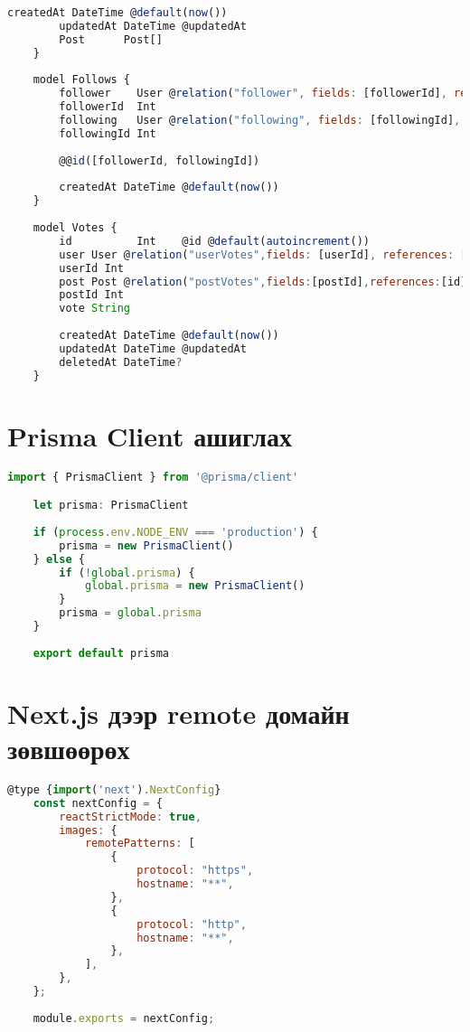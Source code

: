 \begin{lstlisting}[language=Javascript, frame=single]
		createdAt DateTime @default(now())
		updatedAt DateTime @updatedAt
		Post      Post[]
	}
	
	model Follows {
		follower    User @relation("follower", fields: [followerId], references: [id])
		followerId  Int
		following   User @relation("following", fields: [followingId], references: [id])
		followingId Int
	
		@@id([followerId, followingId])
	
		createdAt DateTime @default(now())
	}
	
	model Votes {
		id          Int    @id @default(autoincrement())
		user User @relation("userVotes",fields: [userId], references: [id])
		userId Int
		post Post @relation("postVotes",fields:[postId],references:[id])
		postId Int
		vote String
	
		createdAt DateTime @default(now())
		updatedAt DateTime @updatedAt
		deletedAt DateTime?
	}
\end{lstlisting}

\chapter{Prisma Client ашиглах}
\label{appendix:prisma-client}

\begin{lstlisting}[language=Javascript, frame=single]
	import { PrismaClient } from '@prisma/client'

	let prisma: PrismaClient
	
	if (process.env.NODE_ENV === 'production') {
		prisma = new PrismaClient()
	} else {
		if (!global.prisma) {
			global.prisma = new PrismaClient()
		}
		prisma = global.prisma
	}
	
	export default prisma
\end{lstlisting}

\chapter{Next.js дээр remote домайн зөвшөөрөх}
\label{appendix:next-config}

\begin{lstlisting}[language=Javascript, frame=single]
	@type {import('next').NextConfig}
	const nextConfig = {
		reactStrictMode: true,
		images: {
			remotePatterns: [
				{
					protocol: "https",
					hostname: "**",
				},
				{
					protocol: "http",
					hostname: "**",
				},
			],
		},
	};
	
	module.exports = nextConfig;
	
\end{lstlisting}

